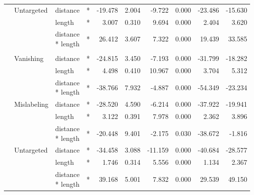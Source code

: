 \begin{longtable}[t]{llllrrrrrr}
\cmidrule{2-10}\nopagebreak
\hspace{1em} & Untargeted & distance & * & -19.478 & 2.004 & -9.722 & 0.000 & -23.486 & -15.630\\
\cmidrule{3-10}\nopagebreak
\hspace{1em} &  & length & * & 3.007 & 0.310 & 9.694 & 0.000 & 2.404 & 3.620\\
\cmidrule{3-10}\nopagebreak
\hspace{1em} &  & distance * length & * & 26.412 & 3.607 & 7.322 & 0.000 & 19.439 & 33.585\\
\cmidrule{1-10}\pagebreak[0]
\addlinespace[0.3em]
\multicolumn{10}{l}{\textbf{Cascade R-CNN}}\\
\hspace{1em} & Vanishing & distance & * & -24.815 & 3.450 & -7.193 & 0.000 & -31.799 & -18.282\\
\cmidrule{3-10}\nopagebreak
\hspace{1em} &  & length & * & 4.498 & 0.410 & 10.967 & 0.000 & 3.704 & 5.312\\
\cmidrule{3-10}\nopagebreak
\hspace{1em} &  & distance * length & * & -38.766 & 7.932 & -4.887 & 0.000 & -54.349 & -23.234\\
\cmidrule{2-10}\nopagebreak
\hspace{1em} & Mislabeling & distance & * & -28.520 & 4.590 & -6.214 & 0.000 & -37.922 & -19.941\\
\cmidrule{3-10}\nopagebreak
\hspace{1em} &  & length & * & 3.122 & 0.391 & 7.978 & 0.000 & 2.362 & 3.896\\
\cmidrule{3-10}\nopagebreak
\hspace{1em} &  & distance * length & * & -20.448 & 9.401 & -2.175 & 0.030 & -38.672 & -1.816\\
\cmidrule{2-10}\nopagebreak
\hspace{1em} & Untargeted & distance & * & -34.458 & 3.088 & -11.159 & 0.000 & -40.684 & -28.577\\
\cmidrule{3-10}\nopagebreak
\hspace{1em} &  & length & * & 1.746 & 0.314 & 5.556 & 0.000 & 1.134 & 2.367\\
\cmidrule{3-10}\nopagebreak
\hspace{1em} &  & distance * length & * & 39.168 & 5.001 & 7.832 & 0.000 & 29.539 & 49.150\\
\bottomrule
\end{longtable}
\endgroup{}

